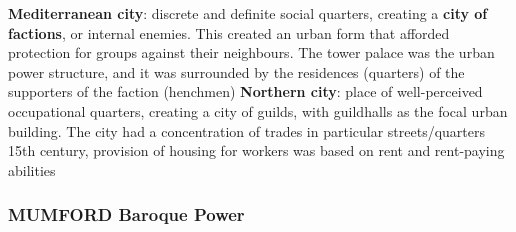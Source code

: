 \documentclass{article}
\begin{document}
\begin{outline}
		\2 \textbf{Mediterranean city}: discrete and definite social quarters, creating a \textbf{city of factions}, or internal enemies. This created an urban form that afforded protection for groups against their neighbours. The tower palace was the urban power structure, and it was surrounded by the residences (quarters) of the supporters of the faction (henchmen)
		\2 \textbf{Northern city}: place of well-perceived occupational quarters, creating a city of guilds, with guildhalls as the focal urban building. The city had a concentration of trades in particular streets/quarters
	\1 15th century, provision of housing for workers was based on rent and rent-paying abilities
\end{outline}

\subsubsection{MUMFORD Baroque Power}
\end{document}
